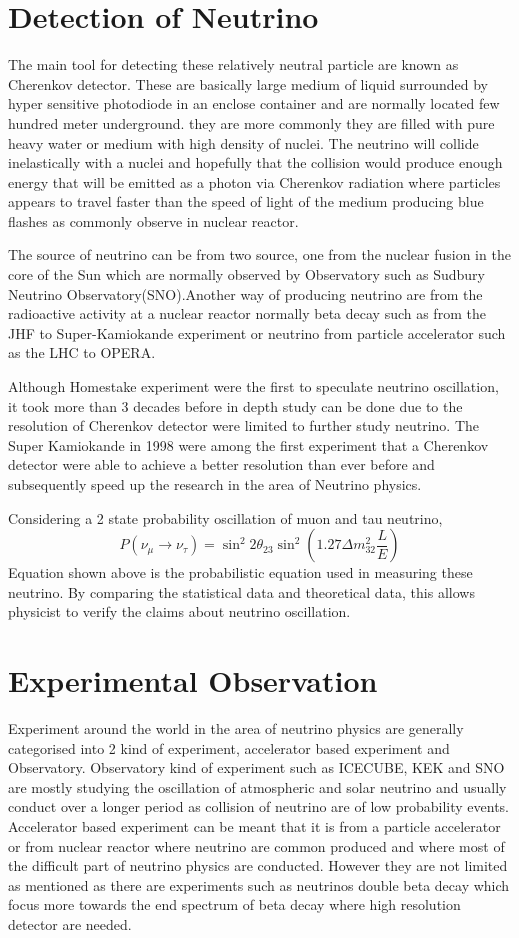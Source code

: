 \documentclass[11pt ,a4paper]{article}
\begin{document}
\section*{Detection of Neutrino}
The main tool for detecting these relatively neutral particle are known as Cherenkov detector. These are basically large medium of liquid surrounded by hyper sensitive photodiode in an enclose container and are normally located few hundred meter underground. they are more commonly they are filled with pure heavy water or medium with high density of nuclei. The neutrino will collide inelastically with a nuclei and hopefully that the collision would produce enough energy that will be emitted as a photon via Cherenkov radiation where particles appears to travel faster than the speed of light of the medium producing blue flashes as commonly observe in nuclear reactor.\cite{kamiokande}

The source of neutrino can be from two source, one from the nuclear fusion in the core of the Sun which are normally observed by Observatory such as Sudbury Neutrino Observatory(SNO).Another way of producing neutrino are from the radioactive activity at a nuclear reactor normally beta decay such as from the JHF to Super-Kamiokande experiment or neutrino from particle accelerator such as the LHC to OPERA. 

Although Homestake experiment were the first to speculate neutrino oscillation, it took more than 3 decades before in depth study can be done due to the resolution of Cherenkov detector were limited to further study neutrino. The Super Kamiokande in 1998 were among the first experiment that a Cherenkov detector were able to achieve a better resolution than ever before and subsequently speed up the research in the area of Neutrino physics. \cite{wolf}

Considering a 2 state probability oscillation of muon and tau neutrino,\cite{king07}
\begin{equation}
P(\nu_{\mu}\to\nu_{\tau})=\sin^2{2\theta_{23}}\sin^2{(1.27\Delta m^2_{32}\frac{L}{E})}
\end{equation}
Equation shown above is the probabilistic equation used in measuring these neutrino. By comparing the statistical data and theoretical data, this allows physicist to verify the claims about neutrino oscillation.
\section*{Experimental Observation}
Experiment around the world in the area of neutrino physics are generally categorised into 2 kind of experiment, accelerator based experiment and Observatory. Observatory kind of experiment such as ICECUBE, KEK and SNO are mostly studying the oscillation of atmospheric and solar neutrino and usually conduct over a longer period as collision of neutrino are of low probability events. Accelerator based experiment can be meant that it is from a particle accelerator or from nuclear reactor where neutrino are common produced and where most of the difficult part of neutrino physics are conducted. However they are not limited as mentioned as there are experiments such as neutrinos double beta decay which focus more towards the end spectrum of beta decay where high resolution detector are needed.
\cite{theta130}
\end{document}
